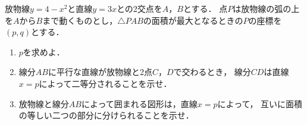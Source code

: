 \documentclass[../../main.tex]{subfiles}
\begin{document}
放物線$y=4-x^2$と直線$y=3x$との2交点を$A$，$B$とする．
点$P$は放物線の弧の上を$A$から$B$まで動くものとし，$\triangle PAB$の面積が最大となるときの$P$の座標を$(p,q)$とする．
\begin{enumerate}
  \item $p$を求めよ．
  \item 線分$AB$に平行な直線が放物線と2点$C$，$D$で交わるとき，
    線分$CD$は直線$x=p$によって二等分されることを示せ．
  \item 放物線と線分$AB$によって囲まれる図形は，直線$x=p$によって，
    互いに面積の等しい二つの部分に分けられることを示せ．
\end{enumerate}
\end{document}
